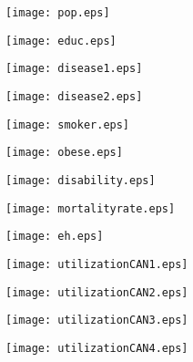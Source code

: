 \documentclass[french,11pt]{article}
\begin{document}


 \begin{landscape}
\begin{figure}[ht]
   \texttt{[image: pop.eps]}
\end{figure}
\begin{figure}[ht]
  \texttt{[image: educ.eps]}
\end{figure}
\begin{figure}[ht]
   \texttt{[image: disease1.eps]}
\end{figure}
\begin{figure}[ht]
    \texttt{[image: disease2.eps]}
\end{figure}
\begin{figure}[ht]
    \texttt{[image: smoker.eps]}
\end{figure}
\begin{figure}[ht]
    \texttt{[image: obese.eps]}
\end{figure}
\begin{figure}[ht]
  \texttt{[image: disability.eps]}
  \end{figure}
\begin{figure}[ht]
  \texttt{[image: mortalityrate.eps]}
\end{figure}
  \begin{figure}[ht]
  \texttt{[image: eh.eps]}
\end{figure}

\begin{figure}[ht]
   \texttt{[image: utilizationCAN1.eps]}
\end{figure}
\begin{figure}[ht]
   \texttt{[image: utilizationCAN2.eps]}
\end{figure}
\begin{figure}[ht]
   \texttt{[image: utilizationCAN3.eps]}
\end{figure}
\begin{figure}[ht]
   \texttt{[image: utilizationCAN4.eps]}
\end{figure}

\end{landscape}


\end{document}
